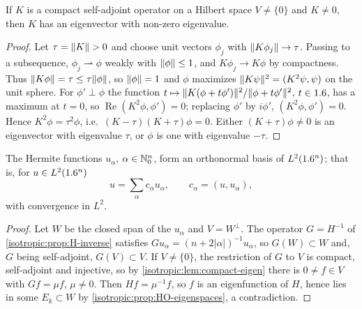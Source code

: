 \begin{lemma}\label{isotropic:lem:compact-eigen}
If $K$ is a compact self-adjoint operator on a Hilbert space $V\ne\{0\}$ and
$K\ne0$, then $K$ has an eigenvector with non-zero eigenvalue.
\end{lemma}
\begin{proof}
Let $\tau=\lVert K\rVert>0$ and choose unit vectors $\phi_j$ with
$\lVert K\phi_j\rVert\to\tau$. Passing to a subsequence, $\phi_j\rightharpoonup\phi$
weakly with $\lVert \phi\rVert\le1$, and $K\phi_j\to K\phi$ by compactness. Thus
$\lVert K\phi\rVert=\tau\le\tau\lVert \phi\rVert$, so $\lVert \phi\rVert=1$ and $\phi$ maximizes
$\lVert K\psi\rVert^2=(K^2\psi,\psi)$ on the unit sphere. For $\phi'\perp\phi$ the
function $t\mapsto\lVert K(\phi+t\phi')\rVert^2/\lVert \phi+t\phi'\rVert^2$, $t\in1.6$, has a
maximum at $t=0$, so $\operatorname{Re}(K^2\phi,\phi')=0$; replacing $\phi'$ by
$i\phi'$, $(K^2\phi,\phi')=0$. Hence $K^2\phi=\tau^2\phi$, i.e.\
$(K-\tau)(K+\tau)\phi=0$. Either $(K+\tau)\phi\ne0$ is an eigenvector with
eigenvalue $\tau$, or $\phi$ is one with eigenvalue $-\tau$.
\end{proof}

\begin{theorem}\label{isotropic:thm:hermite-basis}
The Hermite functions $u_\alpha$, $\alpha\in\mathbb{N}_0^n$, form an orthonormal basis
of $L^2(1.6^n)$; that is, for $u\in L^2(1.6^n)$
\begin{equation}\label{isotropic:eq:hermite-expansion}
  u=\sum_\alpha c_\alpha u_\alpha,\qquad c_\alpha=(u,u_\alpha),
\end{equation}
with convergence in $L^2$.
\end{theorem}
\begin{proof}
Let $W$ be the closed span of the $u_\alpha$ and $V=W^\perp$. The operator
$G=H^{-1}$ of \cref{isotropic:prop:H-inverse} satisfies
$Gu_\alpha=(n+2|\alpha|)^{-1}u_\alpha$, so $G(W)\subset W$ and, $G$ being
self-adjoint, $G(V)\subset V$. If $V\ne\{0\}$, the restriction of $G$ to $V$ is
compact, self-adjoint and injective, so by \cref{isotropic:lem:compact-eigen}
there is $0\ne f\in V$ with $Gf=\mu f$, $\mu\ne0$. Then $Hf=\mu^{-1}f$, so $f$
is an eigenfunction of $H$, hence lies in some $E_k\subset W$ by
\cref{isotropic:prop:HO-eigenspaces}, a contradiction.
\end{proof}

